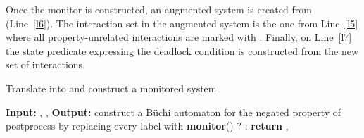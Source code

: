 Once the monitor is constructed, an augmented system  is
created from  (Line~\ref{l6}). The interaction set in the
augmented system  is the one from Line~\ref{l5}
where all property-unrelated interactions  are marked with
. Finally, on Line~\ref{l7} the state predicate 
expressing the deadlock condition is constructed from the new set of
interactions.
\vspace*{.3cm}
\begin{algorithm}
\vspace*{.1cm}
\caption{Translate  into  and construct a monitored system }\label{alg:int}
\vspace*{.1cm}
\vspace*{.1cm}
\begin{algorithmic}[1]
\Statex \textbf{Input: }, , 
\Statex \textbf{Output: }
\vspace*{.1cm}
\State construct a B\"uchi automaton  for the negated property of  \label{l1}
\State postprocess  by replacing every label  with \label{l2}
\State  \textbf{monitor}() 
\label{l3}
\State  {} ? {} : {} \label{l5}
\State  \label{l6}
\State   \label{l7}
\State \textbf{return } , \text{ } 
\end{algorithmic}
\end{algorithm}
